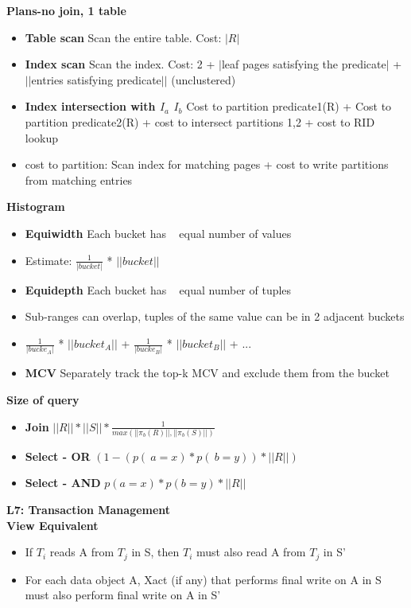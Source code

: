 \documentclass[10pt, landscape]{article}
\begin{document}
\begin{multicols}{4}
\textbf{Plans-no join, 1 table} \\
\begin{itemize}
  \item \textbf{Table scan} Scan the entire table. Cost: $|R|$
  \item \textbf{Index scan} Scan the index. Cost: 2 + $|$leaf pages satisfying the predicate$|$ + $||$entries satisfying predicate$||$ (unclustered)
  \item \textbf{Index intersection with $I_a$ $I_b$} Cost to partition predicate1(R) + Cost to partition predicate2(R) + cost to intersect partitions 1,2 + cost to RID lookup
  \item cost to partition: Scan index for matching pages + cost to write partitions from matching entries
\end{itemize}


\textbf{Histogram} \\ 
\begin{itemize}
  \item \textbf{Equiwidth} Each bucket has ~ equal number of values
  \item Estimate: $\frac{1}{|bucket|}$ * $||bucket||$
  \item \textbf{Equidepth} Each bucket has ~ equal number of tuples
  \item Sub-ranges can overlap, tuples of the same value can be in 2 adjacent buckets
  \item $\frac{1}{|bucke_A|}$ * $||bucket_A||$ + $\frac{1}{|bucke_B|}$ * $||bucket_B||$ + ...
  \item \textbf{MCV} Separately track the top-k MCV and exclude them from the bucket
\end{itemize}

\textbf{Size of query}  \\
\begin{itemize}
  \item \textbf{Join} $||R||*||S||* \frac{1}{max(||\pi_b(R)||,||\pi_b(S)||)}$
  \item \textbf{Select - OR} $(1-(p(~a=x)*p(~b=y))*||R||)$
  \item \textbf{Select - AND} $p(a=x)*p(b=y)*||R||$
\end{itemize}

\textbf{\large{L7: Transaction Management}} \\
\textbf{View Equivalent} \\
\begin{itemize}
  \item If $T_i$ reads A from $T_j$ in S, then $T_i$ must also read A from $T_j$ in S'
  \item For each data object A, Xact (if any) that performs final write on A in S must also perform final write on A in S'
\end{itemize}


\end{multicols}
\end{document}

